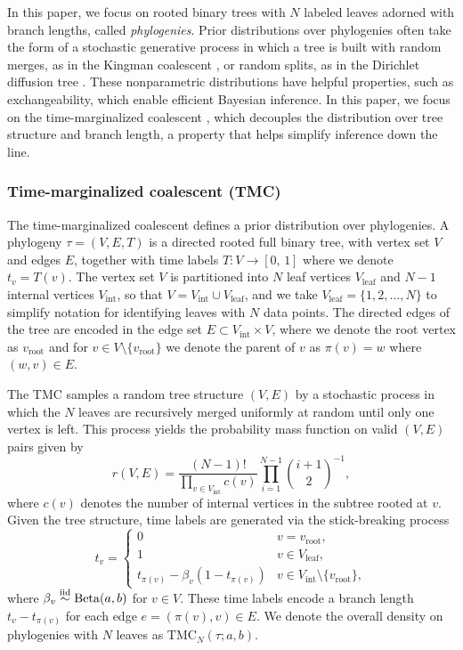In this paper, we focus on
rooted binary trees with $N$ labeled leaves 
adorned with branch lengths,
called \emph{phylogenies}.
Prior distributions over phylogenies
often take the form of a stochastic generative
process in which a tree is built
with random merges, as in the Kingman coalescent \citep{kingman1982coalescent},
or random splits, as in the Dirichlet diffusion tree \citep{neal2003density}.
These nonparametric distributions have
helpful properties, such as exchangeability,
which enable efficient Bayesian inference.
In this paper, we focus on the time-marginalized
coalescent \citep[TMC; ][]{boyles2012time}, which decouples the
distribution over tree structure and branch length,
a property that helps simplify inference down the line.

\subsubsection{Time-marginalized coalescent (TMC)}
The time-marginalized coalescent defines a prior distribution over phylogenies.
A phylogeny $\tau = (V, E, T)$ is a directed rooted full binary tree, with vertex set $V$ and edges $E$, together with time labels $T: V \to [0, \, 1]$ where we denote $t_v = T(v)$.
The vertex set $V$ is partitioned into $N$ leaf vertices $V_\text{leaf}$ and $N-1$ internal vertices $V_\text{int}$, so that $V = V_\text{int} \cup V_\text{leaf}$, and we take $V_\text{leaf} = \{1, 2, \ldots, N\}$ to simplify notation for identifying leaves with $N$ data points.
The directed edges of the tree are encoded in the edge set $E \subset V_\text{int} \times V$, where we denote the root vertex as $v_\text{root}$ and for $v \in V \setminus \{v_\text{root}\}$ we denote the parent of $v$ as $\pi(v) = w$ where $(w, v) \in E$.

The TMC samples a random tree structure $(V, E)$ by a stochastic process in which the $N$ leaves are recursively merged uniformly at random until only one vertex is left.
This process yields the probability mass function on valid $(V, E)$ pairs given by
\begin{equation}
    r(V, E) = \frac{(N - 1)!}{\prod_{v \in V_\text{int}} c(v)} \prod_{i = 1}^{N-1} {i+1 \choose 2}^{-1},
\end{equation}
where $c(v)$ denotes the number of internal vertices in the subtree rooted at $v$.
Given the tree structure, time labels are generated via the stick-breaking process
\begin{equation}
    t_v = \begin{cases} 0 & v = v_\text{root}, \\ 1 & v \in V_\text{leaf}, \\ t_{\pi(v)} - \beta_v (1 - t_{\pi(v)}) & v \in V_\text{int} \setminus \{v_\text{root}\}, \end{cases}
\end{equation}
where $\beta_v \stackrel{\mathrm{iid}}{\sim} \mathrm{Beta}(a, b)$ for $v \in V$. These time labels encode a branch length $t_v - t_{\pi(v)}$ for each edge $e = (\pi(v), v) \in E$. We denote the overall density on phylogenies with $N$ leaves as $\mathrm{TMC}_N(\tau; a, b)$.

